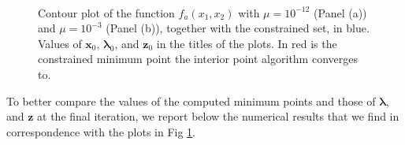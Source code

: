 \documentclass[a4paper,11pt]{article}
\begin{document}
\begin{figure}[H]
	\centering
	 \
	\caption{Contour plot of the function $f_{a}(x_{1},x_{2})$ with $\mu=10^{-12}$ (Panel (a)) and $\mu=10^{-3}$ (Panel (b)), together with the constrained set, in blue. Values of $\textbf{x}_{0}$, $\boldsymbol{\lambda}_{0}$, and $\textbf{z}_{0}$ in the titles of the plots. In red is the constrained minimum point the interior point algorithm converges to.}
	\label{Fig:func_a_diff_mu}
\end{figure}

\noindent To better compare the values of the computed minimum points and those of $\boldsymbol{\lambda}$, and $\textbf{z}$ at the final iteration, we report below the numerical results that we find in correspondence with the plots in Fig \ref{Fig:func_a_diff_mu}.\\
\end{document}
